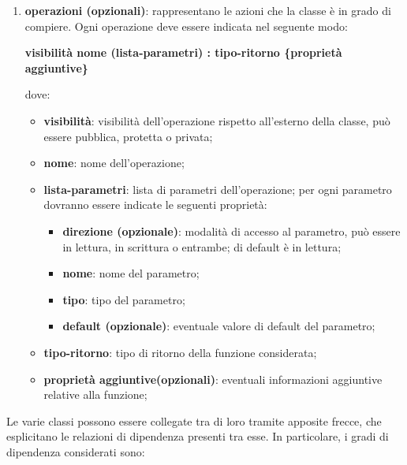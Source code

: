 \begin{enumerate}
     		\item{\textbf{operazioni (opzionali)}}: rappresentano le azioni che la classe è in grado di compiere. Ogni operazione deve essere indicata nel seguente modo: 
     			\begin{center}
     				\textbf{visibilità nome (lista-parametri) : tipo-ritorno \{proprietà aggiuntive\}}
     			\end{center}
     		dove: 
     			\begin{itemize}
     				\item{\textbf{visibilità}}: visibilità dell'operazione rispetto all'esterno della classe, può essere pubblica, protetta o privata; 
     				\item{\textbf{nome}}: nome dell'operazione; 
     				\item{\textbf{lista-parametri}}: lista di parametri dell'operazione; per ogni parametro dovranno essere indicate le seguenti proprietà: 
	     				\begin{itemize}
	     					\item{\textbf{direzione (opzionale)}}: modalità di accesso al parametro, può essere in lettura, in scrittura o entrambe; di default è in lettura;  
	     					\item{\textbf{nome}}: nome del parametro; 
	     					\item{\textbf{tipo}}: tipo del parametro; 
	     					\item{\textbf{default (opzionale)}}: eventuale valore di default del parametro; 	
	     				\end{itemize} 
     				\item{\textbf{tipo-ritorno}}: tipo di ritorno della funzione considerata;       					
					\item{\textbf{proprietà aggiuntive(opzionali)}}: eventuali informazioni aggiuntive relative alla funzione; 
     			\end{itemize}
     	\end{enumerate}
     	Le varie classi possono essere collegate tra di loro tramite apposite frecce, che esplicitano le relazioni di dipendenza presenti tra esse. In particolare, i gradi di dipendenza considerati sono: 
